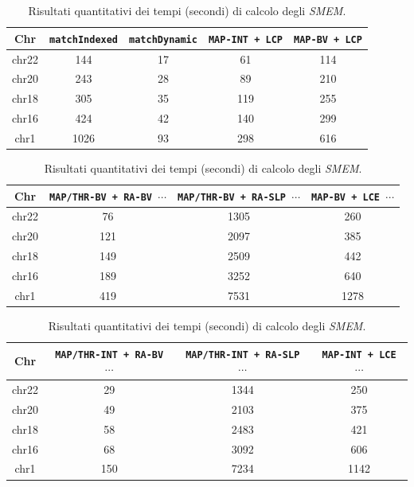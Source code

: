  

\begin{table}
  \centering
  \caption{Risultati quantitativi dei tempi (secondi) di calcolo degli
    \textit{SMEM}.}  
  \label{tab:exetime}
  \footnotesize
  \begin{tabular}{c||c|c|c|c} 
    \textbf{Chr}
    & \textbf{\texttt{matchIndexed}}
    & \textbf{\texttt{matchDynamic}}
    & \textbf{\texttt{MAP-INT \newline+ LCP}}
    & \textbf{\texttt{MAP-BV \newline+ LCP}}\\
    \hline
    \hline
    chr22 & 144 & 17 & 61 & 114 \\
    chr20 & 243 & 28 & 89 & 210 \\
    chr18 & 305 & 35 & 119 & 255 \\
    chr16 & 424 & 42 & 140 & 299 \\
    chr1 & 1026 & 93 & 298 & 616
  \end{tabular}
  \vspace{+3mm}
  \vspace{+1mm}
  \begin{tabular}{c||c|c|c} 
    \textbf{Chr}
    & \textbf{\texttt{MAP/THR-BV + RA-BV $\cdots$}}
    & \textbf{\texttt{MAP/THR-BV + RA-SLP $\cdots$}}
    & \textbf{\texttt{MAP-BV + LCE $\cdots$}}\\
    \hline
    \hline
    chr22 & 76 & 1305 & 260 \\
    chr20 & 121 & 2097 & 385  \\
    chr18 & 149 & 2509 & 442  \\
    chr16 & 189 & 3252 & 640 \\
    chr1 & 419 & 7531 & 1278 
  \end{tabular}
  \vspace{+3mm}
  \vspace{+1mm}
  \begin{tabular}{c||c|c|c} 
    \textbf{Chr}
    & \textbf{\texttt{MAP/THR-INT + RA-BV $\cdots$}}
    & \textbf{\texttt{MAP/THR-INT + RA-SLP $\cdots$}}
    & \textbf{\texttt{MAP-INT + LCE $\cdots$}}\\
    \hline
    \hline
    chr22 & 29 & 1344 & 250 \\
    chr20 & 49 & 2103 & 375 \\
    chr18 & 58 & 2483 & 421 \\
    chr16 & 68 & 3092 & 606 \\
    chr1 & 150 & 7234 & 1142

  \end{tabular}
\end{table}

